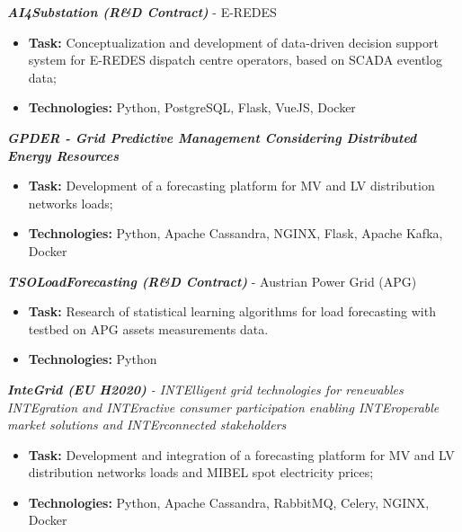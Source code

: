 \documentclass{mycv}
\begin{document}
\begin{myitemize}	

	\item \textit{\textbf{AI4Substation (R\&D Contract)}} - E-REDES
	\begin{itemize}
		\item \textbf{Task:} Conceptualization and development of data-driven decision support system for E-REDES dispatch centre operators, based on SCADA eventlog data;
		\item \textbf{Technologies:} Python, PostgreSQL, Flask, VueJS, Docker
	\end{itemize}

	\vspace{0.30cm}	
	\item \textit{\textbf{GPDER - Grid Predictive Management Considering Distributed Energy Resources}}
	\begin{itemize}
		\item \textbf{Task:} Development of a forecasting platform for MV and LV distribution networks loads;
		\item \textbf{Technologies:} Python, Apache Cassandra, NGINX, Flask, Apache Kafka, Docker
	\end{itemize}

	\vspace{0.30cm}	
	\item \textit{\textbf{TSOLoadForecasting (R\&D Contract)}} - Austrian Power Grid (APG)
	\begin{itemize}
		\item \textbf{Task:} Research of statistical learning algorithms for load forecasting with  testbed on APG assets measurements data.
		\item \textbf{Technologies:} Python
	\end{itemize}
	
	\vspace{0.30cm}	
	\item \textit{\textbf{InteGrid (EU H2020)} - INTElligent grid technologies for renewables INTEgration and INTEractive consumer participation enabling INTEroperable market solutions and INTErconnected stakeholders}
	\begin{itemize}
		\item \textbf{Task:} Development and integration of a forecasting platform for MV and LV distribution networks loads and MIBEL spot electricity prices;
		\item \textbf{Technologies:} Python, Apache Cassandra, RabbitMQ, Celery, NGINX, Docker
	\end{itemize}


\end{myitemize}
\end{document}

